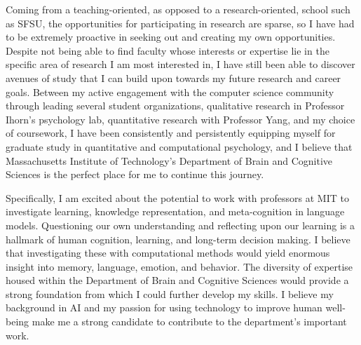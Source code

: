 \documentclass[12pt]{article}
\begin{document}
Coming from a teaching-oriented, as opposed to a research-oriented, school such as SFSU, the opportunities for participating in research are
sparse, so I have had to be extremely proactive in seeking out and creating my own opportunities.  Despite not being able to find faculty
whose interests or expertise lie in the specific area of research I am most interested in, I have still been able to discover avenues of study
that I can build upon towards my future research and career goals.  Between my active engagement with the computer science community through
leading several student organizations, qualitative research in Professor Ihorn's psychology lab, quantitative research with Professor Yang,
and my choice of coursework, I have been consistently and persistently equipping myself for graduate study in quantitative and computational
psychology, and I believe that Massachusetts Institute of Technology's Department of Brain and Cognitive Sciences is the perfect place for
me to continue this journey.

Specifically, I am excited about the potential to work with professors at MIT to investigate learning, knowledge representation, and
meta-cognition in language models.  Questioning our own understanding and reflecting upon our learning is a hallmark of human cognition,
learning, and long-term decision making. I believe that investigating these with computational methods would yield enormous insight into
memory, language, emotion, and behavior.  The diversity of expertise housed within the Department of Brain and Cognitive Sciences would
provide a strong foundation from which I could further develop my skills.  I believe my background in AI and my passion for using technology
to improve human well-being make me a strong candidate to contribute to the department's important work.


\end{document}
